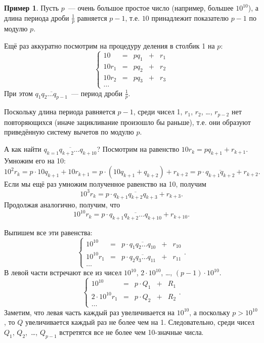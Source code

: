 \documentclass[a4paper,14pt]{extarticle}
\theoremstyle{plain}
\theoremstyle{definition}
\newtheorem{example}{Пример}
\theoremstyle{remark}
\begin{document}
\begin{example}
Пусть $p$~--- очень большое простое число (например, большее $10^{10}$), а длина
периода дроби $\frac{1}{p}$ равняется $p-1$, т.е. $10$ принадлежит показателю $p-1$ по модулю $p$.

Ещё раз аккуратно посмотрим на процедуру деления в столбик 1 на $p$:
\[
\left\{\begin{array}{rcccl}
        10 & = & pq_1 & + & r_1 \\
        10r_1 & = & pq_2 & + & r_2 \\
        10r_2 & = & pq_3 & + & r_3 \\
        \ldots 
        \end{array}
\right.
\]
При этом $\overline{q_1q_2\ldots q_{p-1}}$~--- период дроби $\frac{1}{p}$.

Поскольку длина периода равняется $p-1$, среди чисел 1, $r_1$, $r_2$, \ldots, $r_{p-2}$
нет повторяющихся (иначе зацикливание произошло бы раньше), т.е. они образуют приведённую систему вычетов по модулю $p$. 

А как найти $\overline{q_{k=1}q_{k+2}\ldots q_{k+10}}$? Посмотрим на равенство $10r_k=pq_{k+1}+r_{k+1}$.
Умножим его на 10: 
\[
10^2r_k=p\cdot 10q_{k+1}+10r_{k+1}=p\cdot (10q_{k+1}+q_{k+2})+r_{k+2}=p\cdot \overline{q_{k+1}q_{k+2}}+r_{k+2}. 
\]
Если мы ещё раз умножим полученное равенство на 10, получим 
\[
10^3r_k=p\cdot \overline{q_{k+1}q_{k+2}q_{k+3}}+r_{k+3}.
\]
Продолжая аналогично, получим, что 
\[
10^{10}r_k=p\cdot \overline{q_{k+1}q_{k+2}\ldots q_{k+10}}+r_{k+10}.
\]

Выпишем все эти равенства:
\[
\left\{\begin{array}{rcccl}
        10^{10} & = & p\cdot \overline{q_1q_2\ldots q_{10}} & + & r_{10} \\
        10^{10}r_1 & = & p\cdot \overline{q_2q_3\ldots q_{11}} & + & r_{11} \\
        \ldots 
       \end{array}
\right..
\]
В левой части встречают все из чисел $10^{10}$, $2\cdot 10^{10}$, \ldots, $(p-1)\cdot 10^{10}$.
\[
\left\{\begin{array}{rcccl}
        10^{10} & = & p\cdot Q_1 & + & R_1 \\
        2\cdot 10^{10}r_1 & = & p\cdot Q_2 & + & R_2 \\
        \ldots 
       \end{array}
\right.. 
\]
Заметим, что левая часть каждый раз увеличивается на $10^{10}$, а поскольку $p>10^{10}$,
то $Q$ увеличивается каждый раз не более чем на 1. Следовательно,
среди чисел $Q_1$, $Q_2$,~\ldots, $Q_{p-1}$ встретятся все не более чем 10-значные числа.
\end{example}
\end{document}
